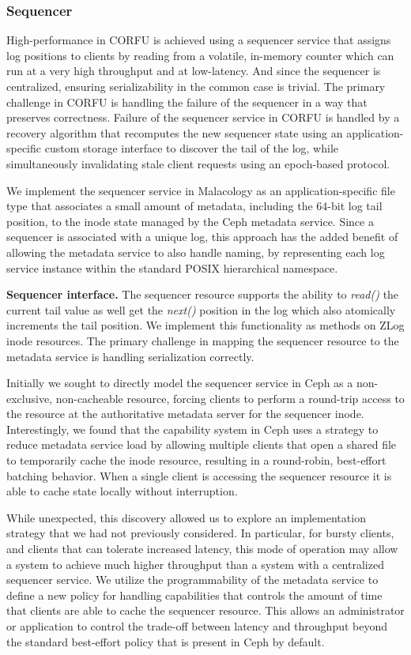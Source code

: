 \documentclass[preprint]{sigplanconf-eurosys}
\begin{document}
\subsubsection{Sequencer}

High-performance in CORFU is achieved using a sequencer service that assigns
log positions to clients by reading from a volatile, in-memory counter which
can run at a very high throughput and at low-latency. And since the sequencer
is centralized, ensuring serializability in the common case is trivial.  The
primary challenge in CORFU is handling the failure of the sequencer in a way
that preserves correctness. Failure of the sequencer service in CORFU is
handled by a recovery algorithm that recomputes the new sequencer state using
an application-specific custom storage interface to discover the tail of the
log, while simultaneously invalidating stale client requests using an
epoch-based protocol.

We implement the sequencer service in Malacology as an application-specific
file type that associates a small amount of metadata, including the 64-bit log
tail position, to the inode state managed by the Ceph metadata service. Since
a sequencer is associated with a unique log, this approach has the added
benefit of allowing the metadata service to also handle naming, by
representing each log service instance within the standard POSIX hierarchical
namespace.

{\bf Sequencer interface.} The sequencer resource supports the ability to
\emph{read()} the current tail value as well get the \emph{next()} position in
the log which also atomically increments the tail position. We implement this
functionality as methods on ZLog inode resources. The primary challenge in
mapping the sequencer resource to the metadata service is handling
serialization correctly.

Initially we sought to directly model the sequencer service in Ceph as a
non-exclusive, non-cacheable resource, forcing clients to perform a round-trip
access to the resource at the authoritative metadata server for the sequencer
inode.  Interestingly, we found that the capability system in Ceph uses a
strategy to reduce metadata service load by allowing multiple clients that
open a shared file to temporarily cache the inode resource, resulting in a
round-robin, best-effort batching behavior. When a single client is accessing
the sequencer resource it is able to cache state locally without interruption.

While unexpected, this discovery allowed us to explore an implementation
strategy that we had not previously considered. In particular, for bursty
clients, and clients that can tolerate increased latency, this mode of operation may
allow a system to achieve much higher throughput than a system with a
centralized sequencer service.
We utilize the programmability of the metadata service to define a new policy
for handling capabilities that controls the amount of time that clients are
able to cache the sequencer resource. This allows an administrator or
application to control the trade-off between latency and throughput beyond the
standard best-effort policy that is present in Ceph by default.
\end{document}
